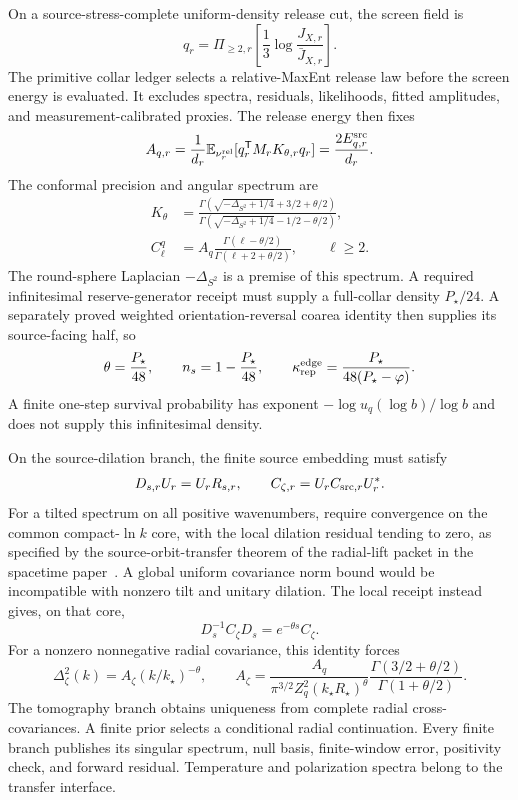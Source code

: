 \documentclass[11pt]{article}
\theoremstyle{remark}
\begin{document}
On a source-stress-complete uniform-density release cut, the screen field is
\begin{equation}
q_r=\Pi_{\ge2,r}\left[\frac13\log\frac{J_{X,r}}{\bar J_{X,r}}\right].
\end{equation}
The primitive collar ledger selects a relative-MaxEnt release law before the
screen energy is evaluated. It excludes spectra, residuals, likelihoods,
fitted amplitudes, and measurement-calibrated proxies. The release energy then
fixes
\begin{equation}
A_{q,r}=\frac1{d_r}\mathbb E_{\nu_r^{\rm rel}}
[q_r^{\mathsf T}M_rK_{\theta,r}q_r]
=\frac{2E_{q,r}^{\rm src}}{d_r}.
\end{equation}
The conformal precision and angular spectrum are
\begin{align}
K_\theta
&=\frac{\Gamma(\sqrt{-\Delta_{S^2}+1/4}+3/2+\theta/2)}
{\Gamma(\sqrt{-\Delta_{S^2}+1/4}-1/2-\theta/2)},\\
C_\ell^q
&=A_q\frac{\Gamma(\ell-\theta/2)}
{\Gamma(\ell+2+\theta/2)},\qquad \ell\ge2.
\end{align}
The round-sphere Laplacian \(-\Delta_{S^2}\) is a premise of this spectrum.
A required infinitesimal reserve-generator receipt must supply a full-collar
density \(P_\star/24\). A separately proved weighted
orientation-reversal coarea identity then supplies its source-facing half, so
\begin{equation}
\theta=\frac{P_\star}{48},\qquad
n_s=1-\frac{P_\star}{48},\qquad
\kappa_{\rm rep}^{\rm edge}=\frac{P_\star}{48(P_\star-\varphi)}.
\end{equation}
A finite one-step survival probability has exponent
\(-\log u_q(\log b)/\log b\) and does not supply this infinitesimal density.

On the source-dilation branch, the finite source embedding must satisfy
\begin{equation}
D_{s,r}U_r=U_rR_{s,r},\qquad
C_{\zeta,r}=U_rC_{{\rm src},r}U_r^*.
\end{equation}
For a tilted spectrum on all positive wavenumbers, require convergence on
the common compact-$\ln k$ core, with the local dilation residual tending to
zero, as specified by the source-orbit-transfer theorem of the radial-lift
packet in the spacetime paper~\cite{ophEinstein}. A global
uniform covariance norm bound would be incompatible with nonzero tilt and
unitary dilation. The local receipt instead gives, on that core,
\begin{equation}
D_s^{-1}C_\zeta D_s=e^{-\theta s}C_\zeta.
\end{equation}
For a nonzero nonnegative radial covariance, this identity forces
\begin{equation}
\Delta_\zeta^2(k)=A_\zeta(k/k_\star)^{-\theta},\qquad
A_\zeta=\frac{A_q}{\pi^{3/2}Z_q^2(k_\star R_\star)^\theta}
\frac{\Gamma(3/2+\theta/2)}{\Gamma(1+\theta/2)}.
\end{equation}
The tomography branch obtains uniqueness from complete radial cross-covariances.
A finite prior selects a conditional radial continuation. Every finite branch
publishes its singular spectrum, null basis, finite-window error, positivity
check, and forward residual. Temperature and polarization spectra belong to the
transfer interface.
\end{document}
